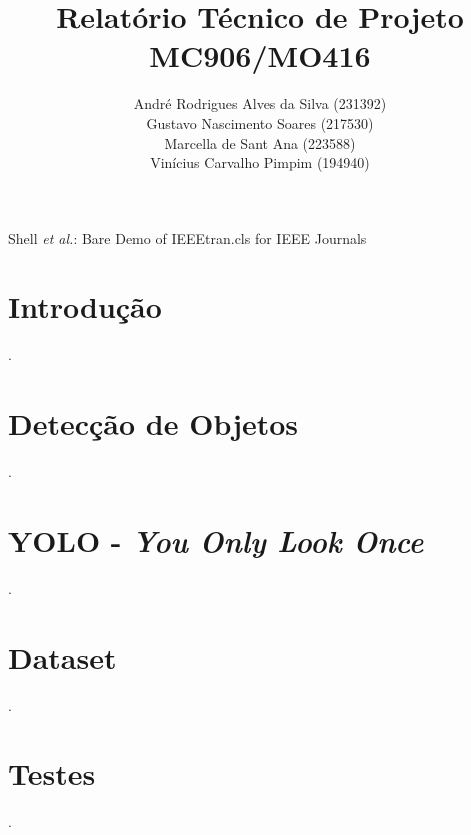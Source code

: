 \documentclass[journal]{IEEEtran}
\begin{document}
\title{Relatório Técnico de Projeto\\ MC906/MO416 }

\author{
André Rodrigues Alves da Silva (231392) \\
Gustavo Nascimento Soares (217530) \\ 
Marcella de Sant Ana (223588) \\
Vinícius Carvalho Pimpim (194940)
} %




%
{Shell \MakeLowercase{\textit{et al.}}: Bare Demo of IEEEtran.cls for IEEE Journals}

\maketitle

\renewcommand{\abstractname}{Resumo\hspace{0.1cm}}


\IEEEpeerreviewmaketitle


\section{Introdução}
\label{sec:introducao}

 \lipsum[1].

\section{Detecção de Objetos}
\label{sec:deteccao_objetos}
\lipsum[1].

\section{YOLO - \textit{You Only Look Once}}
\label{sec:yolo}
\lipsum[1].

\section{Dataset}
\label{sec:dataset}
\lipsum[1].

\section{Testes}
\label{sec:testes}
\lipsum[1].
\end{document}
